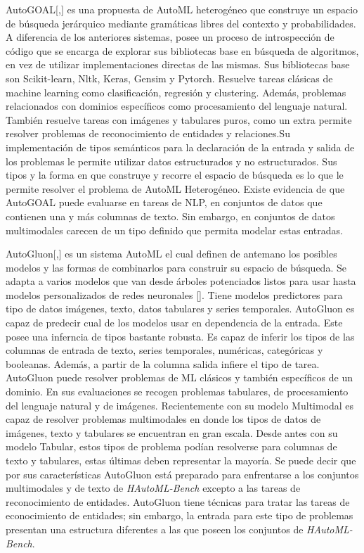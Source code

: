 AutoGOAL[\cite{40},\cite{41}] es una propuesta de AutoML heterogéneo que construye un espacio de búsqueda jerárquico mediante gramáticas libres del contexto y 
probabilidades. A diferencia de los anteriores sistemas, posee un proceso de introspección de código que se encarga de explorar sus bibliotecas base en búsqueda de 
algoritmos, en vez de utilizar implementaciones directas de las mismas. Sus bibliotecas base son Scikit-learn, Nltk, Keras, Gensim y Pytorch. Resuelve tareas clásicas 
de machine learning como clasificación, regresión y clustering. Además, problemas relacionados con dominios específicos como procesamiento del lenguaje natural. También 
resuelve tareas con imágenes y tabulares puros, como un extra permite resolver problemas de reconocimiento de entidades y relaciones.Su implementación de tipos 
semánticos para la declaración de la entrada y salida de los problemas le permite utilizar datos estructurados y no estructurados. Sus tipos y la forma en que construye 
y recorre el espacio de búsqueda es lo que le permite resolver el problema de AutoML Heterogéneo. Existe evidencia de que AutoGOAL puede evaluarse en tareas de  NLP, 
en conjuntos de datos que contienen una y más columnas de texto. Sin embargo, en conjuntos de datos multimodales carecen de un tipo definido que permita modelar estas 
entradas.   

AutoGluon[\cite{17},\cite{42}] es un sistema AutoML el cual definen de antemano los posibles modelos y las formas de combinarlos para construir su espacio de búsqueda.
Se adapta a varios modelos que van desde árboles potenciados listos para usar hasta modelos personalizados de redes neuronales [\cite{37}]. Tiene modelos predictores 
para tipo de datos imágenes, texto, datos tabulares y series temporales. AutoGluon es capaz de predecir cual de los modelos usar en dependencia de la entrada.
Este posee una inferncia de tipos bastante robusta. Es capaz de inferir los tipos de las columnas de entrada de texto, series temporales, numéricas, categóricas y 
booleanas. Además, a partir de la columna salida infiere el tipo de tarea. AutoGluon puede resolver problemas de ML clásicos y también específicos de un dominio. En 
sus evaluaciones se recogen problemas tabulares, de procesamiento del lenguaje natural y de imágenes. Recientemente con su modelo Multimodal es capaz de resolver 
problemas multimodales en donde los tipos de datos de imágenes, texto y tabulares se encuentran en gran escala. Desde antes con su modelo Tabular, estos tipos de 
problema podían resolverse para columnas de texto y tabulares, estas últimas deben representar la mayoría. 
Se puede decir que por sus características AutoGluon está preparado para enfrentarse a los conjuntos multimodales y de texto de \textit{HAutoML-Bench} excepto a las 
tareas de reconocimiento de entidades. AutoGluon tiene técnicas para tratar las tareas de econocimiento de entidades; sin embargo, la entrada para este tipo de problemas
presentan una estructura diferentes a las que poseen los conjuntos de \textit{HAutoML-Bench}.  

